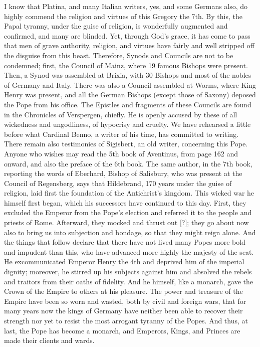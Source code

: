 I know that Platina, and many Italian writers, yes, and some Germans also, do highly commend the religion and virtues of this Gregory the 7th. By this, the Papal tyranny, under the guise of religion, is wonderfully augmented and confirmed, and many are blinded. Yet, through God’s grace, it has come to pass that men of grave authority, religion, and virtues have fairly and well stripped off the disguise from this beast. Therefore, Synods and Councils are not to be condemned; first, the Council of Mainz, where 19 famous Bishops were present. Then, a Synod was assembled at Brixia, with 30 Bishops and most of the nobles of Germany and Italy. There was also a Council assembled at Worms, where King Henry was present, and all the German Bishops (except those of Saxony) deposed the Pope from his office. The Epistles and fragments of these Councils are found in the Chronicles of Verspergen, chiefly. He is openly accused by these of all wickedness and ungodliness, of hypocrisy and cruelty. We have rehearsed a little before what Cardinal Benno, a writer of his time, has committed to writing. There remain also testimonies of Sigisbert, an old writer, concerning this Pope. Anyone who wishes may read the 5th book of Aventinus, from page 162 and onward, and also the preface of the 6th book. The same author, in the 7th book, reporting the words of Eberhard, Bishop of Salisbury, who was present at the Council of Regensberg, says that Hildebrand, 170 years under the guise of religion, laid first the foundation of the Antichrist’s kingdom. This wicked war he himself first began, which his successors have continued to this day. First, they excluded the Emperor from the Pope’s election and referred it to the people and priests of Rome. Afterward, they mocked and thrust out [?]; they go about now also to bring us into subjection and bondage, so that they might reign alone. And the things that follow declare that there have not lived many Popes more bold and impudent than this, who have advanced more highly the majesty of the seat. He excommunicated Emperor Henry the 4th and deprived him of the imperial dignity; moreover, he stirred up his subjects against him and absolved the rebels and traitors from their oaths of fidelity. And he himself, like a monarch, gave the Crown of the Empire to others at his pleasure. The power and treasure of the Empire have been so worn and wasted, both by civil and foreign wars, that for many years now the kings of Germany have neither been able to recover their strength nor yet to resist the most arrogant tyranny of the Popes. And thus, at last, the Pope has become a monarch, and Emperors, Kings, and Princes are made their clients and wards.

